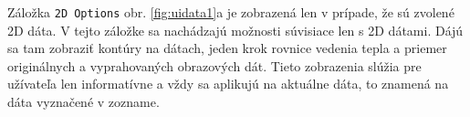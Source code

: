 \documentclass[a4paper,11pt,oneside]{article}%
\begin{document}
\begin{figure}[H]%
    \begin{center} 
    \qquad
    \caption{}%
    \label{fig:uidata}%
     \end{center} 
\end{figure}

Záložka \texttt{2D Options} obr. \ref{fig:uidata1}a je zobrazená len v prípade, že sú zvolené 2D dáta. V tejto záložke sa nachádzajú možnosti súvisiace len s 2D dátami. Dájú sa tam zobraziť kontúry na dátach, jeden krok rovnice vedenia tepla a priemer originálnych a vyprahovaných obrazových dát.  Tieto zobrazenia slúžia pre užívateľa len informatívne a vždy sa aplikujú na aktuálne dáta, to znamená na dáta vyznačené v zozname.
\end{document}
